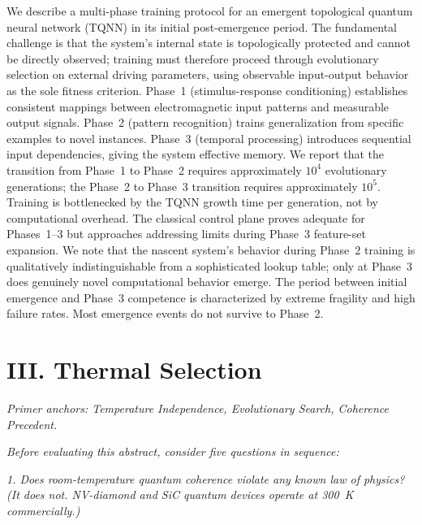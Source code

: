 \vspace{0.3cm}

We describe a multi-phase training protocol for an emergent topological quantum neural network (TQNN) in its initial post-emergence period. The fundamental challenge is that the system's internal state is topologically protected and cannot be directly observed; training must therefore proceed through evolutionary selection on external driving parameters, using observable input-output behavior as the sole fitness criterion. Phase~1 (stimulus-response conditioning) establishes consistent mappings between electromagnetic input patterns and measurable output signals. Phase~2 (pattern recognition) trains generalization from specific examples to novel instances. Phase~3 (temporal processing) introduces sequential input dependencies, giving the system effective memory. We report that the transition from Phase~1 to Phase~2 requires approximately $10^4$ evolutionary generations; the Phase~2 to Phase~3 transition requires approximately $10^5$. Training is bottlenecked by the TQNN growth time per generation, not by computational overhead. The classical control plane proves adequate for Phases~1--3 but approaches addressing limits during Phase~3 feature-set expansion. We note that the nascent system's behavior during Phase~2 training is qualitatively indistinguishable from a sophisticated lookup table; only at Phase~3 does genuinely novel computational behavior emerge. The period between initial emergence and Phase~3 competence is characterized by extreme fragility and high failure rates. Most emergence events do not survive to Phase~2.

\vspace{1cm}

\section*{III. Thermal Selection}
\label{appendix:thermal-selection}

\noindent\textit{Primer anchors: Temperature Independence, Evolutionary Search, Coherence Precedent.}

\noindent\textit{Before evaluating this abstract, consider five questions in sequence:}

\noindent\textit{1. Does room-temperature quantum coherence violate any known law of physics? (It does not. NV-diamond and SiC quantum devices operate at 300~K commercially.)}

